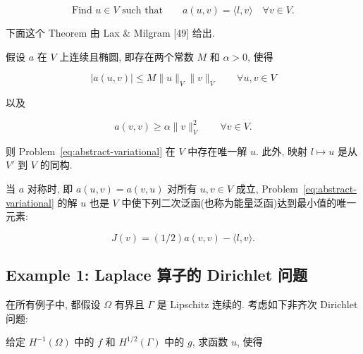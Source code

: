 \begin{equation}\tag{P}\label{eq:abstract-variational}
\text{Find }u\in V\text{ such that}\qquad a(u,v)=\langle l,v\rangle\quad\forall v\in V.
\end{equation}

下面这个 Theorem 由 Lax \& Milgram [49] 给出.

\setcounter{statement}{6}
\renewcommand{\theHstatement}{theorem.\thesection.\arabic{statement}}
\begin{Theorem}\label{thm:lax-milgram}
假设 $a$ 在 $V$ 上连续且椭圆, 即存在两个常数 $M$ 和 $\alpha>0$, 使得

\begin{equation}\label{eq:lax-milgram-continuity}
|a(u,v)|\leq M\|u\|_V\|v\|_V\qquad\forall u,v\in V
\end{equation}

以及

\begin{equation}\label{eq:lax-milgram-ellipticity}
a(v,v)\geq\alpha\|v\|_V^2\qquad\forall v\in V.
\end{equation}

则 Problem~\eqref{eq:abstract-variational} 在 $V$ 中存在唯一解 $u$. 此外, 映射 $l\mapsto u$ 是从 $V'$ 到 $V$ 的同构.
\end{Theorem}


\setcounter{statement}{1}
\renewcommand{\theHstatement}{corollary.\thesection.\arabic{statement}}
\begin{Corollary}\label{cor:lax-milgram-energy-minimizer}
当 $a$ 对称时, 即 $a(u,v)=a(v,u)$ 对所有 $u,v\in V$ 成立,
Problem~\eqref{eq:abstract-variational} 的解 $u$ 也是 $V$ 中使下列二次泛函(也称为能量泛函)达到最小值的唯一元素:

\begin{equation}\label{eq:energy-functional}
J(v)=(1/2)a(v,v)-\langle l,v\rangle.
\end{equation}
\end{Corollary}

\subsection{Example 1: Laplace 算子的 Dirichlet 问题}\label{subsec:laplace-dirichlet-example}

在所有例子中, 都假设 $\Omega$ 有界且 $\Gamma$ 是 Lipschitz 连续的. 考虑如下非齐次 Dirichlet 问题:

给定 $H^{-1}(\Omega)$ 中的 $f$ 和 $H^{1/2}(\Gamma)$ 中的 $g$, 求函数 $u$, 使得

